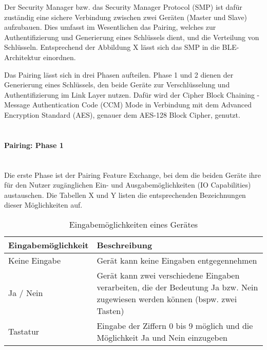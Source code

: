 Der Security Manager bzw. das Security Manager Protocol (SMP) ist dafür zuständig eine sichere Verbindung zwischen zwei Geräten (Master und Slave) aufzubauen. Dies umfasst im Wesentlichen das Pairing, welches zur Authentifizierung und Generierung eines Schlüssels dient, und die Verteilung von Schlüsseln. Entsprechend der Abbildung X lässt sich das SMP in die BLE-Architektur einordnen.

Das Pairing lässt sich in drei Phasen aufteilen. Phase 1 und 2 dienen der Generierung eines Schlüssels, den beide Geräte zur Verschlüsselung und Authentifizierung im Link Layer nutzen. Dafür wird der Cipher Block Chaining - Message Authentication Code (CCM) Mode in Verbindung mit dem Advanced Encryption Standard (AES), genauer dem AES-128 Block Cipher, genutzt.\\\\

\paragraph{Pairing: Phase 1} \mbox{} \vspace{0.2cm} \\

Die erste Phase ist der Pairing Feature Exchange, bei dem die beiden Geräte ihre für den Nutzer zugänglichen Ein- und Ausgabemöglichkeiten (IO Capabilities) austauschen. Die Tabellen X und Y 
listen die entsprechenden Bezeichnungen dieser Möglichkeiten auf.

\begin{table}
    \begin{tabularx}{\textwidth}{|l|X|}
    \hline
    \textbf{Eingabemöglichkeit} & \textbf{Beschreibung} \\
    \hline
    Keine Eingabe & Gerät kann keine Eingaben entgegennehmen \\
    \hline
    Ja / Nein & Gerät kann zwei verschiedene Eingaben verarbeiten, die der Bedeutung Ja bzw. Nein zugewiesen werden können (bspw. zwei Tasten) \\
    \hline
    Tastatur & Eingabe der Ziffern 0 bis 9 möglich und die Möglichkeit Ja und Nein einzugeben \\
    \hline
    \end{tabularx}
    \caption{Eingabemöglichkeiten eines Gerätes}
\end{table}

